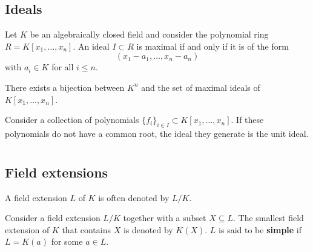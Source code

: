 \subsection{Ideals}

    \begin{theorem}
        Let $K$ be an algebraically closed field and consider the polynomial ring $R=K[x_1,\ldots,x_n]$. An ideal $I\subset R$ is maximal if and only if it is of the form \[(x_1-a_1,\ldots,x_n-a_n)\] with $a_i\in K$ for all $i\leq n$.
    \end{theorem}
    \begin{result}
        There exists a bijection between $K^n$ and the set of maximal ideals of $K[x_1,\ldots,x_n]$.
    \end{result}
    \begin{result}
        Consider a collection of polynomials $\{f_i\}_{i\in I}\subset K[x_1,\ldots,x_n]$. If these polynomials do not have a common root, the ideal they generate is the unit ideal.
    \end{result}

\section{}
\subsection{Field extensions}

    \begin{notation}
        A field extension $L$ of $K$ is often denoted by $L/K$.
    \end{notation}


    \begin{notation}[Generation]
        Consider a field extension $L/K$ together with a subset $X\subseteq L$. The smallest field extension of $K$ that contains $X$ is denoted by $K(X)$. $L$ is said to be \textbf{simple} if $L=K(a)$ for some $a\in L$.
    \end{notation}

